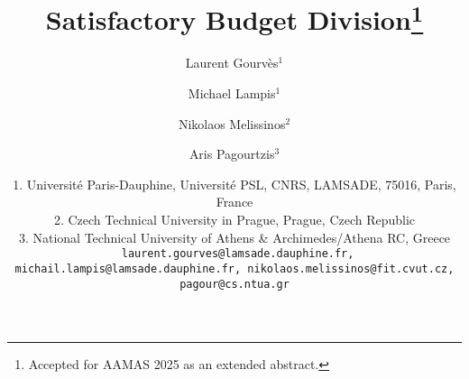 \documentclass{article}
\begin{document}
\title{Satisfactory Budget Division\thanks{Accepted for AAMAS 2025 as an extended abstract.}}
\author{Laurent Gourv{\`e}s$^{1}$ 
\and Michael Lampis$^1$ \and  Nikolaos Melissinos$^2$\and Aris Pagourtzis$^3$}

\date{{\small 1. Universit\'e Paris-Dauphine, Universit\'e PSL, CNRS, LAMSADE, 75016, Paris, France\\
2. Czech Technical University in Prague, Prague, Czech Republic\\
3. National Technical University of Athens \& Archimedes/Athena RC, Greece\\
\texttt{  laurent.gourves@lamsade.dauphine.fr, michail.lampis@lamsade.dauphine.fr, nikolaos.melissinos@fit.cvut.cz, pagour@cs.ntua.gr}
}
}




         

\def\dell{{\sf d}}
\def\D{{\sf D}}
\def\cost{\textbf{cost}}
\def\AAS{{\sc all-agents-sat}}

\setlength\extrarowheight{5pt}


\newcommand{\xmark}{\ding{55}}%
\newcommand{\cmark}{\ding{51}}%


\newcommand{\commentLaurent}[1]{\textcolor{blue}{(L: #1)}}

\newcommand{\commentAris}[1]{\textcolor{magenta}{(AP: #1)}}

\newtheorem{instance}{Instance}
\newtheorem{definition}{Definition}
\newtheorem{observation}{Observation}
\newtheorem{theorem}{Theorem}
\newtheorem{lemma}{Lemma}
\newtheorem{proposition}{Proposition}


\maketitle 

\end{document}
